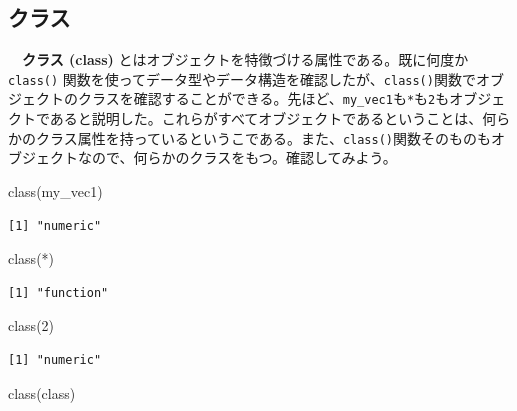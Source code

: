 \documentclass[
  a4paper,
  pandoc,
  ja=standard,
  jafont=haranoaji]{bxjsbook}
\newenvironment{Shaded}{\begin{snugshade}}{\end{snugshade}}
\newcommand{\AttributeTok}[1]{\textcolor[rgb]{0.00,0.48,0.65}{#1}}
\newcommand{\DecValTok}[1]{\textcolor[rgb]{0.68,0.00,0.00}{#1}}
\newcommand{\FunctionTok}[1]{\textcolor[rgb]{0.28,0.35,0.67}{#1}}
\newcommand{\NormalTok}[1]{\textcolor[rgb]{0.00,0.48,0.65}{#1}}
\newcommand{\StringTok}[1]{\textcolor[rgb]{0.13,0.47,0.30}{#1}}
\begin{document}
\hypertarget{ux30afux30e9ux30b9}{%
\subsection{クラス}\label{ux30afux30e9ux30b9}}

　\textbf{クラス (class)}
とはオブジェクトを特徴づける属性である。既に何度か \texttt{class()}
関数を使ってデータ型やデータ構造を確認したが、\texttt{class()}関数でオブジェクトのクラスを確認することができる。先ほど、\texttt{my\_vec1}も\texttt{*}も\texttt{2}もオブジェクトであると説明した。これらがすべてオブジェクトであるということは、何らかのクラス属性を持っているというこである。また、\texttt{class()}関数そのものもオブジェクトなので、何らかのクラスをもつ。確認してみよう。

\begin{Shaded}
\begin{Highlighting}[numbers=left,,]
\FunctionTok{class}\NormalTok{(my\_vec1)}
\end{Highlighting}
\end{Shaded}

\begin{verbatim}
[1] "numeric"
\end{verbatim}

\begin{Shaded}
\begin{Highlighting}[numbers=left,,]
\FunctionTok{class}\NormalTok{(}\StringTok{\textasciigrave{}}\AttributeTok{*}\StringTok{\textasciigrave{}}\NormalTok{)}
\end{Highlighting}
\end{Shaded}

\begin{verbatim}
[1] "function"
\end{verbatim}

\begin{Shaded}
\begin{Highlighting}[numbers=left,,]
\FunctionTok{class}\NormalTok{(}\DecValTok{2}\NormalTok{)}
\end{Highlighting}
\end{Shaded}

\begin{verbatim}
[1] "numeric"
\end{verbatim}

\begin{Shaded}
\begin{Highlighting}[numbers=left,,]
\FunctionTok{class}\NormalTok{(class)}
\end{Highlighting}
\end{Shaded}
\end{document}
